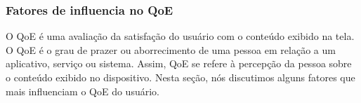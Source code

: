 %
%
%
%

\subsubsection{Fatores de influencia no QoE}

O QoE é uma avaliação da satisfação do usuário com o conteúdo exibido na tela. O QoE é o grau de prazer ou aborrecimento de uma pessoa em relação a um aplicativo, serviço ou sistema. Assim, QoE se refere à percepção da pessoa sobre o conteúdo exibido no dispositivo. Nesta seção, nós discutimos alguns fatores que mais influenciam o QoE do usuário. 

